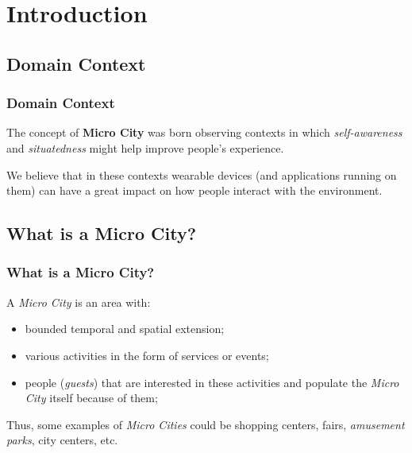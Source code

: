 \section{Introduction}\label{sec:introduction}
\frame{\tableofcontents[currentsection]}

\subsection{Domain Context}\label{subsec:domain-context}
\begin{frame}
    \frametitle{Domain Context}
    The concept of \textbf{Micro City} was born observing contexts in which \textit{self-awareness} and \textit{situatedness} might help improve people's experience.

    \bigskip

    We believe that in these contexts wearable devices (and applications running on them) can have a great impact on how people interact with the environment.

\end{frame}

\subsection{What is a Micro City?}\label{subsec:what-is-a-micro-city?}
\begin{frame}
    \frametitle{What is a Micro City?}
    A \textit{Micro City} is an area with:
    \begin{itemize}
        \item bounded temporal and spatial extension;
        \item various activities in the form of services or events;
        \item people (\textit{guests}) that are interested in these activities and populate the \textit{Micro City} itself because of them;
    \end{itemize}

    \bigskip

    Thus, some examples of \textit{Micro Cities} could be shopping centers, fairs, \textit{amusement parks}, city centers, etc.

\end{frame}

